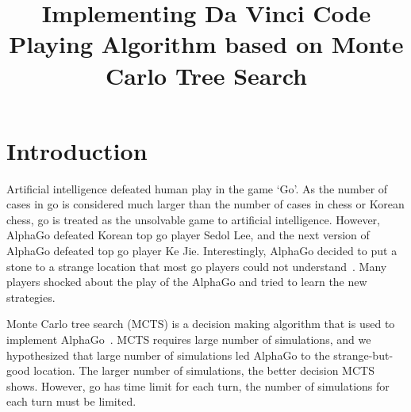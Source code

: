 \documentclass[conference]{IEEEtran}
\begin{document}
\title{Implementing Da Vinci Code Playing Algorithm based on Monte Carlo Tree Search}

\author{
\and
{}
\and
{}
}

\maketitle


\begin{abstract}
%
\end{abstract}




\IEEEpeerreviewmaketitle


\section{Introduction}
 
Artificial intelligence defeated human play in the game `Go'.
As the number of cases in go is considered much larger than the number of cases in chess or Korean chess, go is treated as the unsolvable game to artificial intelligence.
However, AlphaGo defeated Korean top go player Sedol Lee, and the next version of AlphaGo defeated top go player Ke Jie.
Interestingly, AlphaGo decided to put a stone to a strange location that most go players could not understand~\cite{wierd_alphago}.
Many players shocked about the play of the AlphaGo and tried to learn the new strategies.

Monte Carlo tree search (MCTS) is a decision making algorithm that is used to implement AlphaGo~\cite{silver2016mastering_alphago}.
MCTS requires large number of simulations, and we hypothesized that large number of simulations led AlphaGo to the strange-but-good location.
The larger number of simulations, the better decision MCTS shows.
However, go has time limit for each turn, the number of simulations for each turn must be limited.
\end{document}
